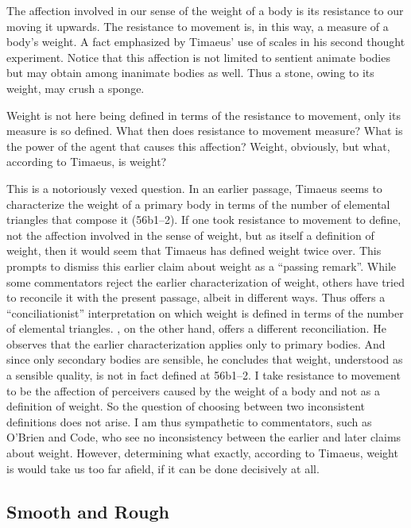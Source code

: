The affection involved in our sense of the weight of a body is its resistance to our moving it upwards. The resistance to movement is, in this way, a measure of a body's weight. A fact emphasized by Timaeus' use of scales in his second thought experiment. Notice that this affection is not limited to sentient animate bodies but may obtain among inanimate bodies as well. Thus a stone, owing to its weight, may crush a sponge. 

Weight is not here being defined in terms of the resistance to movement, only its measure is so defined. What then does resistance to movement measure? What is the power of the agent that causes this affection? Weight, obviously, but what, according to Timaeus, is weight?

This is a notoriously vexed question. In an earlier passage, Timaeus seems to characterize the weight of a primary body in terms of the number of elemental triangles that compose it (56b1--2). If one took resistance to movement to define, not the affection involved in the sense of weight, but as itself a definition of weight, then it would seem that Timaeus has defined weight twice over. This prompts \citet[136--d]{Cherniss:1944ma} to dismiss this earlier claim about weight as a ``passing remark''. While some commentators reject the earlier characterization of weight, others have tried to reconcile it with the present passage, albeit in different ways. Thus \citet[chapter 8]{OBrien:1984ji} offers a ``conciliationist'' interpretation on which weight is defined in terms of the number of elemental triangles. \citet{Code:2010bz}, on the other hand, offers a different reconciliation. He observes that the earlier characterization applies only to primary bodies. And since only secondary bodies are sensible, he concludes that weight, understood as a sensible quality, is not in fact defined at 56b1--2. I take resistance to movement to be the affection of perceivers caused by the weight of a body and not as a definition of weight. So the question of choosing between two inconsistent definitions does not arise. I am thus sympathetic to commentators, such as O'Brien and Code, who see no inconsistency between the earlier and later claims about weight. However, determining what exactly, according to Timaeus, weight is would take us too far afield, if it can be done decisively at all.


\subsection{Smooth and Rough} %
\label{sub:smooth_and_rough}

